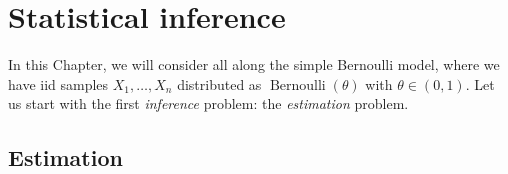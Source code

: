 \documentclass[
	fontsize=11pt, %
	twoside=false, %
	numbers=noenddot, %
]{kaobook}
\DeclareMathOperator{\ber}{Bernoulli}
\begin{document}









\mainmatter %








\setchapterpreamble[u]{\margintoc}
\chapter{Statistical inference}
\label{chap:statistical_inference}

In this Chapter, we will consider all along the simple Bernoulli model, where we have iid samples $X_1, \ldots, X_n$ distributed as $\ber(\theta)$ with $\theta \in (0, 1)$.
Let us start with the first \emph{inference} problem: the \emph{estimation} problem.

\section{Estimation} %
\label{sec:estimation}
\end{document}
